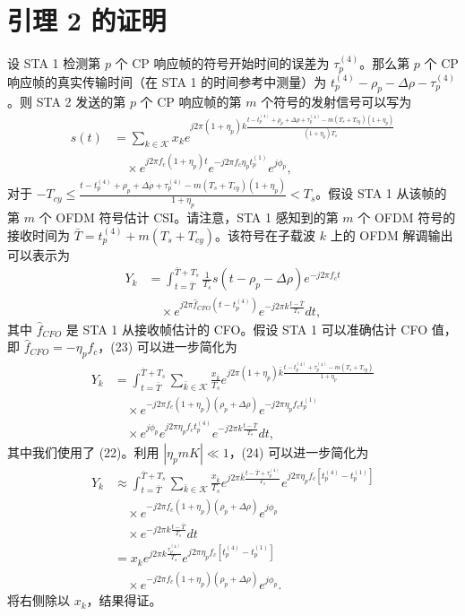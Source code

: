 \documentclass[journal]{IEEEtran}
\begin{document}
\section{引理 2 的证明}
设 STA 1 检测第 $p$ 个 CP 响应帧的符号开始时间的误差为 $\tau_p^{(4)}$。那么第 $p$ 个 CP 响应帧的真实传输时间（在 STA 1 的时间参考中测量）为 $t_p^{(4)} - \rho_p - \Delta\rho - \tau_p^{(4)}$。则 STA 2 发送的第 $p$ 个 CP 响应帧的第 $m$ 个符号的发射信号可以写为
\begin{align}
s(t) &= \sum_{k \in \mathcal{K}} x_k e^{j2\pi (1+\eta_p) k \frac{t - t_p^{(4)} + \rho_p + \Delta\rho + \tau_p^{(4)} - m(T_s + T_{cy})(1+\eta_p)}{(1+\eta_p)T_s}} \nonumber \\
&\quad \times e^{j2\pi f_c(1+\eta_p)t} e^{-j2\pi f_c \eta_p t_p^{(1)}} e^{j\phi_p}, \label{eq:22}
\end{align}
对于 $-T_{cy} \le \frac{t - t_p^{(4)} + \rho_p + \Delta\rho + \tau_p^{(4)} - m(T_s + T_{cy})(1+\eta_p)}{1+\eta_p} < T_s$。假设 STA 1 从该帧的第 $m$ 个 OFDM 符号估计 CSI。请注意，STA 1 感知到的第 $m$ 个 OFDM 符号的接收时间为 $\bar{T} = t_p^{(4)} + m(T_s + T_{cy})$。该符号在子载波 $k$ 上的 OFDM 解调输出可以表示为
\begin{align}
Y_k &= \int_{t=\bar{T}}^{\bar{T} + T_s} \frac{1}{T_s} s(t - \rho_p - \Delta\rho) e^{-j2\pi f_c t} \nonumber \\
&\quad \times e^{j2\pi \hat{f}_{CFO}(t - t_p^{(4)})} e^{-j2\pi k \frac{t - \bar{T}}{T_s}} dt, \label{eq:23}
\end{align}
其中 $\hat{f}_{CFO}$ 是 STA 1 从接收帧估计的 CFO。假设 STA 1 可以准确估计 CFO 值，即 $\hat{f}_{CFO} = -\eta_p f_c$，(23) 可以进一步简化为
\begin{align}
Y_k &= \int_{t=\bar{T}}^{\bar{T} + T_s} \sum_{\bar{k} \in \mathcal{K}} \frac{x_{\bar{k}}}{T_s} e^{j2\pi (1+\eta_p) \bar{k} \frac{t - t_p^{(4)} + \tau_p^{(4)} - m(T_s + T_{cy})}{1+\eta_p}} \nonumber \\
&\quad \times e^{-j2\pi f_c(1+\eta_p)(\rho_p + \Delta\rho)} e^{-j2\pi \eta_p f_c t_p^{(1)}} \nonumber \\
&\quad \times e^{j\phi_p} e^{j2\pi \eta_p f_c t_p^{(4)}} e^{-j2\pi k \frac{t - \bar{T}}{T_s}} dt, \label{eq:24}
\end{align}
其中我们使用了 (22)。利用 $|\eta_p m K| \ll 1$，(24) 可以进一步简化为
\begin{align}
Y_k &\approx \int_{t=\bar{T}}^{\bar{T} + T_s} \sum_{\bar{k} \in \mathcal{K}} \frac{x_{\bar{k}}}{T_s} e^{j2\pi \bar{k} \frac{t - \bar{T} + \tau_p^{(4)}}{T_s}} e^{j2\pi \eta_p f_c [t_p^{(4)} - t_p^{(1)}]} \nonumber \\
&\quad \times e^{-j2\pi f_c(1+\eta_p)(\rho_p + \Delta\rho)} e^{j\phi_p} \nonumber \\
&\quad \times e^{-j2\pi k \frac{t - \bar{T}}{T_s}} dt \nonumber \\
&= x_k e^{j2\pi k \frac{\tau_p^{(4)}}{T_s}} e^{j2\pi \eta_p f_c [t_p^{(4)} - t_p^{(1)}]} \nonumber \\
&\quad \times e^{-j2\pi f_c(1+\eta_p)(\rho_p + \Delta\rho)} e^{j\phi_p}. \label{eq:25}
\end{align}
将右侧除以 $x_k$，结果得证。
\end{document}
